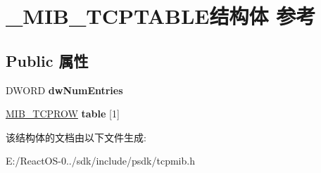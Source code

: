 \hypertarget{struct___m_i_b___t_c_p_t_a_b_l_e}{}\section{\+\_\+\+M\+I\+B\+\_\+\+T\+C\+P\+T\+A\+B\+L\+E结构体 参考}
\label{struct___m_i_b___t_c_p_t_a_b_l_e}
\subsection*{Public 属性}
\begin{DoxyCompactItemize}
\item 
\mbox{\label{struct___m_i_b___t_c_p_t_a_b_l_e_a8e0d31a066abf35ec3c04e156bd1f360}} 
D\+W\+O\+RD {\bfseries dw\+Num\+Entries}
\item 
\mbox{\label{struct___m_i_b___t_c_p_t_a_b_l_e_a909153f9e774f22880e8092067dbd711}} 
\hyperlink{struct___m_i_b___t_c_p_r_o_w}{M\+I\+B\+\_\+\+T\+C\+P\+R\+OW} {\bfseries table} \mbox{[}1\mbox{]}
\end{DoxyCompactItemize}


该结构体的文档由以下文件生成\+:\begin{DoxyCompactItemize}
\item 
E\+:/\+React\+O\+S-\/0../sdk/include/psdk/tcpmib.\+h\end{DoxyCompactItemize}
